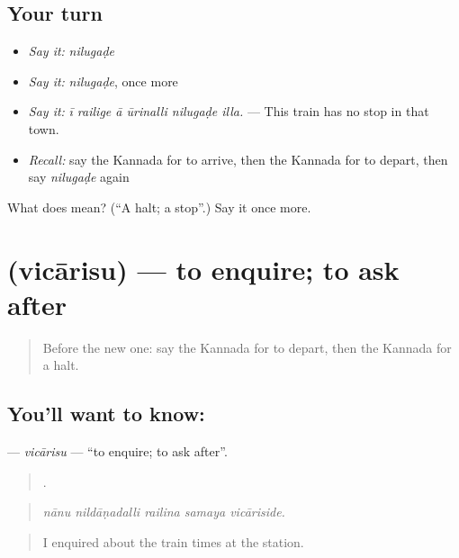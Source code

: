 \subsection*{Your turn}
\begin{itemize}
\raggedright
  \item \emph{Say it:} \emph{nilugaḍe}
  \item \emph{Say it:} \emph{nilugaḍe}, once more
  \item \emph{Say it:} \emph{ī railige ā ūrinalli nilugaḍe illa.} — This train has no stop in that town.
  \item \emph{Recall:} say the Kannada for to arrive, then the Kannada for to depart, then say \emph{nilugaḍe} again
\end{itemize}

\begin{tcolorbox}[breakable,colback=teal!4,colframe=teal!35!black,title={Before you move on}]
What does  mean? (\textquotedblleft{}A halt; a stop\textquotedblright{}.) Say it once more.
\end{tcolorbox}
\section[\texorpdfstring{\kn{ವಿಚಾರಿಸು} (vicārisu)}{ವಿಚಾರಿಸು (vicārisu)}]{ (vicārisu) — to enquire; to ask after}

\label{lesson:KA-C434-vicarisu}



\begin{quote}
Before the new one: say the Kannada for to depart, then the Kannada for a halt.
\end{quote}

\subsection*{You'll want to know: }
\textbf{} — \emph{vicārisu} — \textquotedblleft{}to enquire; to ask after\textquotedblright{}.

\begin{quote}
    .
\end{quote}

\begin{quote}
\emph{nānu nildāṇadalli railina samaya vicāriside.}
\end{quote}

\begin{quote}
I enquired about the train times at the station.
\end{quote}

